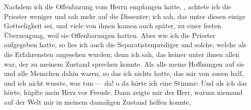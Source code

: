 Nachdem ich die Offenbarung vom Herrn empfangen hatte,
, achtete ich die Priester weniger und
sah mehr auf die Dissenter; ich sah, das unter diesen einige
Gottseligkeit sei, und viele von ihnen kamen auch später, zu einer
festen Überzeugung, weil sie Offenbarungen hatten. Aber wie
ich die Priester aufgegeben hatte, so lies ich auch die 
Separatistenprediger und solche, welche als die Erfahrensten angesehen
wurden; denn ich sah, das keiner unter ihnen allen war, der zu meinem
Zustand sprechen konnte. Als alle meine Hoffnungen auf sie und alle
Menschen dahin waren, so das ich nichts hatte, das mir von ausen
half, und ich nicht wusste, was tun — da! o da hörte ich eine
Stimme:  Und als ich das hörte, hüpfte mein
Herz vor Freude. Dann zeigte mir der Herr, warum niemand
auf der Welt mir in meinem damaligen Zustand helfen konnte,

